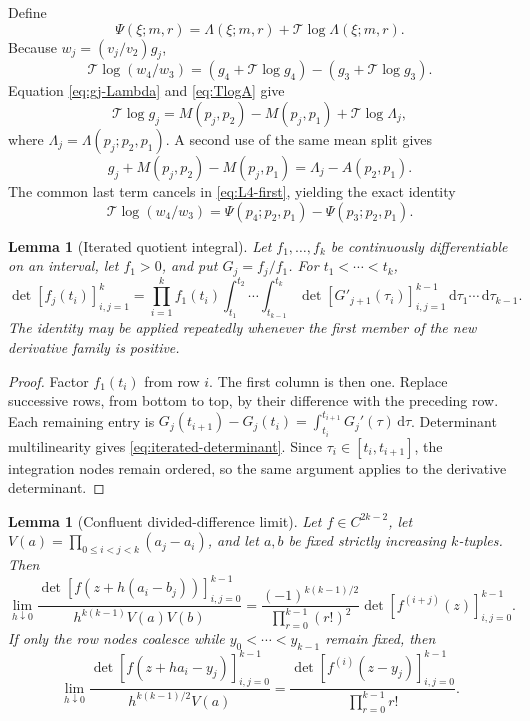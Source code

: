\documentclass[11pt]{article}
\newtheorem{lemma}[theorem]{Lemma}
\theoremstyle{remark}
\newcommand{\T}{\mathcal{T}}
\newcommand{\dd}{\,\mathrm{d}}
\numberwithin{equation}{section}
\begin{document}
Define
\[
 \Psi(\xi;m,r)=\Lambda(\xi;m,r)+\T\log\Lambda(\xi;m,r).
\]
Because \(w_j=(v_j/v_2)g_j\),
\begin{equation}\label{eq:L4-first}
 \T\log(w_4/w_3)
 =(g_4+\T\log g_4)-(g_3+\T\log g_3).
\end{equation}
Equation \eqref{eq:gj-Lambda} and \eqref{eq:TlogA} give
\[
 \T\log g_j=M(p_j,p_2)-M(p_j,p_1)+\T\log\Lambda_j,
\]
where \(\Lambda_j=\Lambda(p_j;p_2,p_1)\). A second use of the same mean split
gives
\[
 g_j+M(p_j,p_2)-M(p_j,p_1)=\Lambda_j-A(p_2,p_1).
\]
The common last term cancels in \eqref{eq:L4-first}, yielding the exact
identity
\begin{equation}\label{eq:L4-Psi}
 \T\log(w_4/w_3)
 =\Psi(p_4;p_2,p_1)-\Psi(p_3;p_2,p_1).
\end{equation}

\begin{lemma}[Iterated quotient integral]\label{lem:quotient-integral}
Let \(f_1,\ldots,f_k\) be continuously differentiable on an interval,
let \(f_1>0\), and put \(G_j=f_j/f_1\). For
\(t_1<\cdots<t_k\),
\begin{equation}\label{eq:iterated-determinant}
 \det[f_j(t_i)]_{i,j=1}^k
 =\prod_{i=1}^k f_1(t_i)
 \int_{t_1}^{t_2}\!\cdots\!\int_{t_{k-1}}^{t_k}
 \det[G'_{j+1}(\tau_i)]_{i,j=1}^{k-1}
 \dd\tau_1\cdots\dd\tau_{k-1}.
\end{equation}
The identity may be applied repeatedly whenever the first member of the new
derivative family is positive.
\end{lemma}

\begin{proof}
Factor \(f_1(t_i)\) from row \(i\). The first column is then one. Replace
successive rows, from bottom to top, by their difference with the preceding
row. Each remaining entry is
\(G_j(t_{i+1})-G_j(t_i)=\int_{t_i}^{t_{i+1}}G_j'(\tau)\dd\tau\).
Determinant multilinearity gives \eqref{eq:iterated-determinant}. Since
\(\tau_i\in[t_i,t_{i+1}]\), the integration nodes remain ordered, so the same
argument applies to the derivative determinant.
\end{proof}

\begin{lemma}[Confluent divided-difference limit]\label{lem:confluent-limit}
Let \(f\in C^{2k-2}\), let
\(V(a)=\prod_{0\leq i<j<k}(a_j-a_i)\), and let \(a,b\) be fixed strictly
increasing \(k\)-tuples. Then
\begin{equation}\label{eq:two-sided-confluence}
 \lim_{h\downarrow0}
 \frac{\det[f(z+h(a_i-b_j))]_{i,j=0}^{k-1}}
 {h^{k(k-1)}V(a)V(b)}
 =\frac{(-1)^{k(k-1)/2}}
 {\prod_{r=0}^{k-1}(r!)^2}
 \det[f^{(i+j)}(z)]_{i,j=0}^{k-1}.
\end{equation}
If only the row nodes coalesce while \(y_0<\cdots<y_{k-1}\) remain fixed,
then
\begin{equation}\label{eq:one-sided-confluence}
 \lim_{h\downarrow0}
 \frac{\det[f(z+ha_i-y_j)]_{i,j=0}^{k-1}}
 {h^{k(k-1)/2}V(a)}
 =\frac{\det[f^{(i)}(z-y_j)]_{i,j=0}^{k-1}}
 {\prod_{r=0}^{k-1}r!}.
\end{equation}
\end{lemma}
\end{document}
